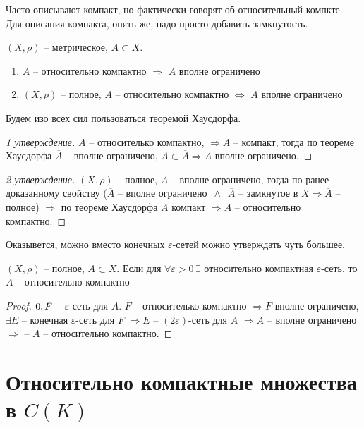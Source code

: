 \documentclass[document]{subfiles}
\begin{document}
Часто описывают компакт, но фактически говорят об относительный компкте. Для описания компакта, опять же, надо просто добавить замкнутость.

\begin{corollary}
    $(X, \rho)$ -- метрическое, $A \subset X$. 
    \begin{enumerate}
        \item $A$ -- относительно компактно $\Rightarrow$ $A$ вполне ограничено 
        \item $(X,\rho)$ -- полное, $A$ -- относительно компактно $\Leftrightarrow$ $A$ вполне ограничено 
    \end{enumerate}
\end{corollary}
Будем изо всех сил пользоваться теоремой Хаусдорфа.
\begin{proof}[1 утверждение]
    $A$ -- относителько компактно, $\Rightarrow \overline{A}$ -- компакт, тогда по теореме Хаусдорфа 
    $\overline{A}$ -- вполне ограничено, $A \subset \overline{A} \Rightarrow A$ вполне ограничено.
\end{proof}

\begin{proof}[2 утверждение]
    $(X, \rho)$ -- полное, $A$ -- вполне ограничено, тогда по ранее доказанному свойству ($\overline{A}$ -- вполне ограничено $\, \wedge \,$ $\overline{A}$ -- замкнутое в $X \Rightarrow \overline{A}$ -- полное) 
    $\Rightarrow$ по теореме Хаусдорфа $\overline{A}$ компакт $\Rightarrow A$ -- относительно компактно.
\end{proof}

Оказывется, можно вместо конечных $\varepsilon$-сетей можно утверждать чуть большее.

\begin{corollary}
    $(X, \rho)$ -- полное, $A \subset X$. Если для $\forall \varepsilon > 0 \, \exists$ относительно компактная $\varepsilon$-сеть, то
    $A$ -- относительно компактно
\end{corollary}

\begin{proof}
    $\let \varepsilon > 0, F$ -- $\varepsilon$-сеть для $A$. $F$ -- относителько компактно $\Rightarrow F$ вполне ограничено,
    $\exists E$ -- конечная $\varepsilon$-сеть для $F$ $\Rightarrow E$ -- $(2\varepsilon)$-сеть для $A$ 
    $\Rightarrow A$ -- вполне ограничено $\Rightarrow$ -- $A$ -- относительно компактно.
\end{proof}

\section{Относительно компактные множества в $C(K)$}
\end{document}
